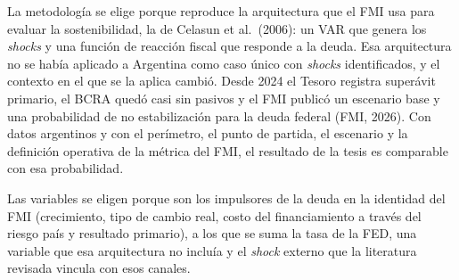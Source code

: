 La metodología se elige porque reproduce la arquitectura que el FMI usa
para evaluar la sostenibilidad, la de Celasun et al.~(2006): un VAR que
genera los \emph{shocks} y una función de reacción fiscal que responde a
la deuda. Esa arquitectura no se había aplicado a Argentina como caso
único con \emph{shocks} identificados, y el contexto en el que se la
aplica cambió. Desde 2024 el Tesoro registra superávit primario, el BCRA
quedó casi sin pasivos y el FMI publicó un escenario base y una
probabilidad de no estabilización para la deuda federal (FMI, 2026). Con
datos argentinos y con el perímetro, el punto de partida, el escenario y
la definición operativa de la métrica del FMI, el resultado de la tesis
es comparable con esa probabilidad.

Las variables se eligen porque son los impulsores de la deuda en la
identidad del FMI (crecimiento, tipo de cambio real, costo del
financiamiento a través del riesgo país y resultado primario), a los que
se suma la tasa de la FED, una variable que esa arquitectura no incluía
y el \emph{shock} externo que la literatura revisada vincula con esos
canales.
